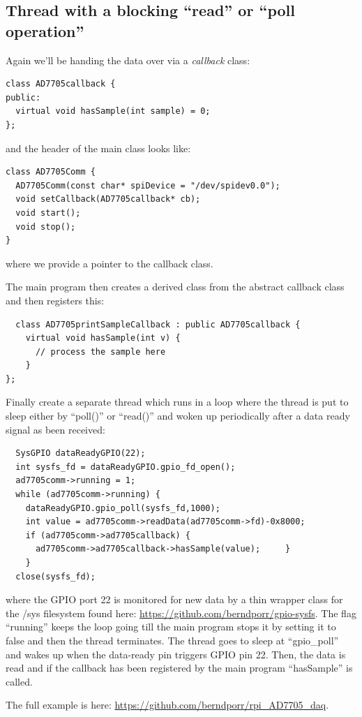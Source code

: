 \documentclass[12pt]{report}
\begin{document}
\subsection{Thread with a blocking ``read'' or ``poll operation''}
Again we'll be handing the data over via a \textsl{callback} class:
\begin{verbatim}
class AD7705callback {
public:
  virtual void hasSample(int sample) = 0;
};
\end{verbatim}

and the header of the main class looks like:
\begin{verbatim}
class AD7705Comm {
  AD7705Comm(const char* spiDevice = "/dev/spidev0.0");
  void setCallback(AD7705callback* cb);
  void start();
  void stop();
}
\end{verbatim}
where we provide a pointer to the callback class.

The main program then creates a derived class from the
abstract callback class and then registers this:
\begin{verbatim}
  class AD7705printSampleCallback : public AD7705callback {
    virtual void hasSample(int v) {
      // process the sample here
    }
};
\end{verbatim}

Finally create a separate thread which runs in a loop
where the thread is put to sleep either by ``poll()'' or ``read()''
and woken up periodically after a data ready
signal as been received:
\begin{verbatim}
  SysGPIO dataReadyGPIO(22);
  int sysfs_fd = dataReadyGPIO.gpio_fd_open();	
  ad7705comm->running = 1;
  while (ad7705comm->running) {
    dataReadyGPIO.gpio_poll(sysfs_fd,1000);
    int value = ad7705comm->readData(ad7705comm->fd)-0x8000;
    if (ad7705comm->ad7705callback) {
      ad7705comm->ad7705callback->hasSample(value);		}
    }
  close(sysfs_fd);
\end{verbatim}
where the GPIO port 22 is monitored for new data by a thin wrapper class for the /sys filesystem
found here: \url{https://github.com/berndporr/gpio-sysfs}. The flag ``running'' keeps
the loop going till the main program stops it by setting it to false and then the thread
terminates. The thread goes to sleep at ``gpio\_poll'' and wakes up when the data-ready
pin triggers GPIO pin 22. Then, the data is read and if the callback has been registered
by the main program ``hasSample'' is called.

The full example is here: \url{https://github.com/berndporr/rpi_AD7705_daq}.
\end{document}
